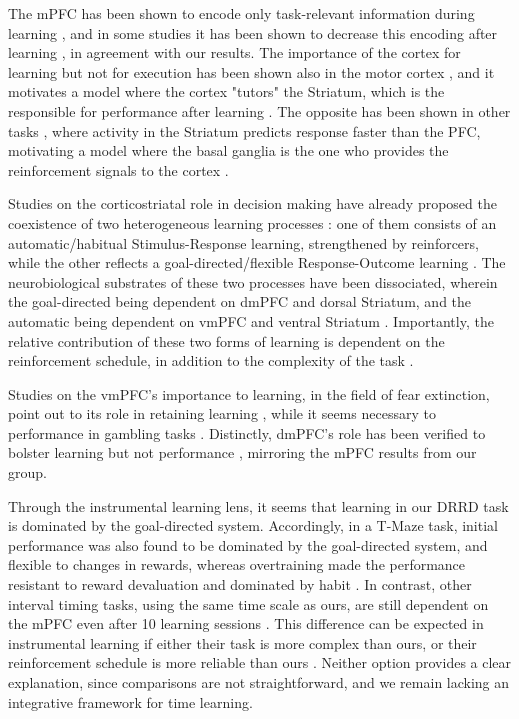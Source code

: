 The mPFC has been shown to encode only task-relevant information during learning \cite{kaplan2017role}, and in some studies it has been shown to decrease this encoding after learning \cite{schuck2015medial}, in agreement with our results. The importance of the cortex for learning but not for execution has been shown also in the motor cortex \cite{kawai2015motor}, and it motivates a model where the cortex "tutors" the Striatum, which is the responsible for performance after learning \cite{murray2017learning}. The opposite has been shown in other tasks \cite{pasupathy2005different}, where activity in the Striatum predicts response faster than the PFC, motivating a model where the basal ganglia is the one who provides the reinforcement signals to the cortex \cite{helie2015learning}. 

Studies on the corticostriatal role in decision making have already proposed the coexistence of two heterogeneous learning processes \cite{balleine1998goal, balleine2007role, smith2013dual}: one of them consists of an automatic/habitual Stimulus-Response learning, strengthened by reinforcers, while the other reflects a goal-directed/flexible Response-Outcome learning \cite{dickinson2015instrumental}. The neurobiological substrates of these two processes have been dissociated, wherein the goal-directed being dependent on dmPFC and dorsal Striatum, and the automatic being dependent on vmPFC and ventral Striatum \cite{dickinson2015instrumental}. Importantly, the relative contribution of these two forms of learning is dependent on the reinforcement schedule, in addition to the complexity of the task \cite{dickinson2015instrumental}. 

Studies on the vmPFC's importance to learning, in the field of fear extinction, point out to its role in retaining learning \cite{phelps2004extinction}, while it seems necessary to performance in gambling tasks \cite{rogalsky2012risky}. Distinctly, dmPFC's role has been verified to bolster learning but not performance \cite{balleine2007still}, mirroring the mPFC results from our group.

Through the instrumental learning lens, it seems that learning in our DRRD task is dominated by the goal-directed system. Accordingly, in a T-Maze task, initial performance was also found to be dominated by the goal-directed system, and flexible to changes in rewards, whereas overtraining made the performance resistant to reward devaluation and dominated by habit \cite{smith2013dual}. In contrast, other interval timing tasks, using the same time scale as ours, are still dependent on the mPFC even after 10 learning sessions \cite{narayanan2006reversible}. This difference can be expected in instrumental learning if either their task is more complex than ours, or their reinforcement schedule is more reliable than ours \cite{dickinson2015instrumental}. Neither option provides a clear explanation, since comparisons are not straightforward, and we remain lacking an integrative framework for time learning.

